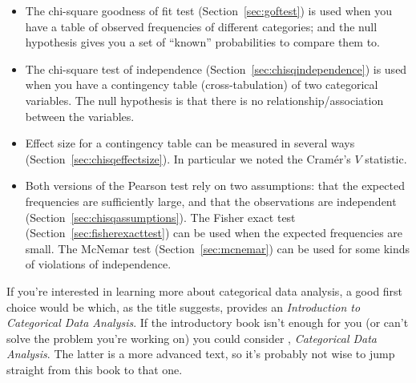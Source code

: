 \begin{itemize}
\item The chi-square goodness of fit test (Section~\ref{sec:goftest}) is used when you have a table of observed frequencies of different categories; and the null hypothesis gives you a set of ``known'' probabilities to compare them to. 
\item The chi-square test of independence (Section~\ref{sec:chisqindependence}) is used when you have a contingency table (cross-tabulation) of two categorical variables. The null hypothesis is that there is no relationship/association between the variables. 
\item Effect size for a contingency table can be measured in several ways (Section~\ref{sec:chisqeffectsize}). In particular we noted the Cram\'er's $V$ statistic.
\item Both versions of the Pearson test rely on two assumptions: that the expected frequencies are sufficiently large, and that the observations are independent (Section~\ref{sec:chisqassumptions}). The Fisher exact test (Section~\ref{sec:fisherexacttest}) can be used when the expected frequencies are small. The McNemar test (Section~\ref{sec:mcnemar}) can be used for some kinds of violations of independence. 
\end{itemize}

\noindent
If you're interested in learning more about categorical data analysis, a good first choice would be  which, as the title suggests, provides an {\it Introduction to Categorical Data Analysis}. If the introductory book isn't enough for you (or can't solve the problem you're working on) you could consider , {\it Categorical Data Analysis}. The latter is a more advanced text, so it's probably not wise to jump straight from this book to that one. 


